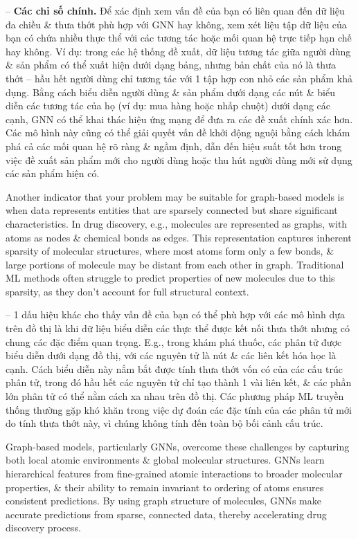 \documentclass{article}
\begin{document}
\begin{itemize}
\begin{itemize}
\begin{itemize}
            -- {\bf Các chỉ số chính.} Để xác định xem vấn đề của bạn có liên quan đến dữ liệu đa chiều \& thưa thớt phù hợp với GNN hay không, xem xét liệu tập dữ liệu của bạn có chứa nhiều thực thể với các tương tác hoặc mối quan hệ trực tiếp hạn chế hay không. Ví dụ: trong các hệ thống đề xuất, dữ liệu tương tác giữa người dùng \& sản phẩm có thể xuất hiện dưới dạng bảng, nhưng bản chất của nó là thưa thớt -- hầu hết người dùng chỉ tương tác với 1 tập hợp con nhỏ các sản phẩm khả dụng. Bằng cách biểu diễn người dùng \& sản phẩm dưới dạng các nút \& biểu diễn các tương tác của họ (ví dụ: mua hàng hoặc nhấp chuột) dưới dạng các cạnh, GNN có thể khai thác hiệu ứng mạng để đưa ra các đề xuất chính xác hơn. Các mô hình này cũng có thể giải quyết vấn đề khởi động nguội bằng cách khám phá cả các mối quan hệ rõ ràng \& ngầm định, dẫn đến hiệu suất tốt hơn trong việc đề xuất sản phẩm mới cho người dùng hoặc thu hút người dùng mới sử dụng các sản phẩm hiện có.

            Another indicator that your problem may be suitable for graph-based models is when data represents entities that are sparsely connected but share significant characteristics. In drug discovery, e.g., molecules are represented as graphs, with atoms as nodes \& chemical bonds as edges. This representation captures inherent sparsity of molecular structures, where most atoms form only a few bonds, \& large portions of molecule may be distant from each other in graph. Traditional ML methods often struggle to predict properties of new molecules due to this sparsity, as they don't account for full structural context.

            -- 1 dấu hiệu khác cho thấy vấn đề của bạn có thể phù hợp với các mô hình dựa trên đồ thị là khi dữ liệu biểu diễn các thực thể được kết nối thưa thớt nhưng có chung các đặc điểm quan trọng. E.g., trong khám phá thuốc, các phân tử được biểu diễn dưới dạng đồ thị, với các nguyên tử là nút \& các liên kết hóa học là cạnh. Cách biểu diễn này nắm bắt được tính thưa thớt vốn có của các cấu trúc phân tử, trong đó hầu hết các nguyên tử chỉ tạo thành 1 vài liên kết, \& các phần lớn phân tử có thể nằm cách xa nhau trên đồ thị. Các phương pháp ML truyền thống thường gặp khó khăn trong việc dự đoán các đặc tính của các phân tử mới do tính thưa thớt này, vì chúng không tính đến toàn bộ bối cảnh cấu trúc.

            Graph-based models, particularly GNNs, overcome these challenges by capturing both local atomic environments \& global molecular structures. GNNs learn hierarchical features from fine-grained atomic interactions to broader molecular properties, \& their ability to remain invariant to ordering of atoms ensures consistent predictions. By using graph structure of molecules, GNNs make accurate predictions from sparse, connected data, thereby accelerating drug discovery process.


\end{itemize}
\end{itemize}
\end{itemize}
\end{document}
